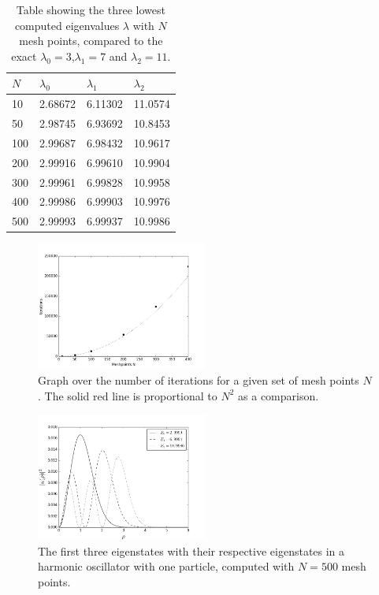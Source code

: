 \documentclass[twoside,twocolumn]{article}
\begin{document}
	\begin{table}[h]
			\caption{Table showing the three lowest computed eigenvalues $\lambda$ with $N$ mesh points, compared to the exact $\lambda_0=3$,$\lambda_1=7$ and $\lambda_2=11$.}\label{tbl:convergence}
		\centering
		\begin{tabular}{|l|l|l|l|}\hline
			$N$ & $\lambda_0$ & $\lambda_1$ & $\lambda_2$\\ \hline
			10 & 2.68672 & 6.11302 & 11.0574\\
			50 & 2.98745 & 6.93692 & 10.8453\\
			100& 2.99687 & 6.98432 & 10.9617\\
			200& 2.99916 & 6.99610 & 10.9904\\
			300& 2.99961 & 6.99828 & 10.9958\\
			400& 2.99986 & 6.99903 & 10.9976\\
			500& 2.99993 & 6.99937 & 10.9986\\\hline
		\end{tabular}
	\end{table}
	\begin{figure}[p]
		\includegraphics[width=0.5\textwidth]{figures/iterations.png} 
		\caption{Graph over the number of iterations for a given set of mesh points $N$. The solid red line is proportional to $N^2$ as a comparison.}\label{fig:iterations}
	\end{figure}
	\begin{figure}[p]
		\includegraphics[width=0.5\textwidth]{../report/figures/eigenvecs123.png} 
		\caption{The first three eigenstates with their respective eigenstates in a harmonic oscillator with one particle, computed with $N=500$ mesh points.}\label{fig:eigenstates}
	\end{figure}
\end{document}
